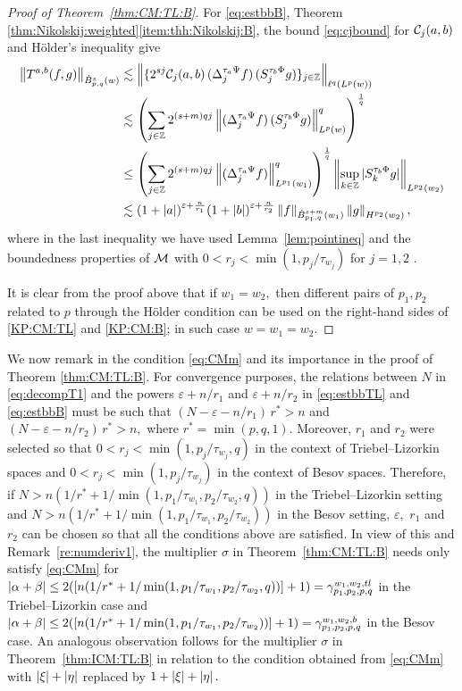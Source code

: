 \begin{proof}[Proof of Theorem~\ref{thm:CM:TL:B}]
For \eqref{eq:estbbB},  Theorem \ref{thm:Nikolskij:weighted}\eqref{item:thh:Nikolskij:B}, the bound \eqref{eq:cjbound} for $\mathcal{C}_j(a,b)$ and H\"older's inequality  give
\begin{align*}
\left\|T^{a,b}(f,g)\right\|_{\dot{B}^s_{p,q}(w)} & \lesssim \left\|\{2^{sj} \mathcal{C}_j(a,b) \,(\Delta^{ \tau_a \Psi }_{j} f ) \, (S^{ \tau_b \Phi }_{j} g)\}_{j\in\mathbb{Z}} \right\|_{\ell^q(L^p(w))}\\
& \lesssim \left(\sum\limits_{j \in \mathbb{Z}}  2^{(s +m) q j}  \left\|(\Delta^{ \tau_a \Psi }_{j} f ) \, (S^{ \tau_b \Phi }_{j} g)\right\|_{L^p(w)}^q   \right)^\frac{1}{q}  \\
&\le  \left(\sum\limits_{j \in \mathbb{Z}}  2^{(s +m) q j}  \left\|(\Delta^{ \tau_a \Psi }_{j} f ) \right\|_{L^{p_1}(w_1)}^q   \right)^\frac{1}{q}  \left\|\sup_{k\in \mathbb{Z}}|S^{ \tau_b \Phi }_{k} g|\right\|_{L^{p_2}(w_2)}\\
& \lesssim  (1+\left\vert a \right\vert)^{\varepsilon+\frac{n}{r_1}}  (1+\left\vert b \right\vert)^{\varepsilon+\frac{n}{r_2}}  \left\|f\right\|_{\dot{B}^{s+m}_{p_1, q}(w_1)} \left\|g\right\|_{H^{p_2}(w_2)},
\end{align*}
where in the last inequality we have used Lemma~\ref{lem:pointineq} and the boundedness properties of $\mathcal{M}$ with  $0<r_j<\min(1,p_j/\tau_{w_j})$ for $j=1,2$ .


It is clear from the proof above that if $w_1=w_2,$ then  different pairs of $p_1, p_2$ related to $p$ through the H\"older condition can be used on the right-hand sides of \eqref{KP:CM:TL} and \eqref{KP:CM:B}; in such case $w=w_1=w_2.$  
\end{proof}


We now remark in the condition \ref{eq:CMm} and its importance in the proof of Theorem \ref{thm:CM:TL:B}.
For convergence purposes, the relations between $N$ in \eqref{eq:decompT1} and the powers  $\varepsilon+n/r_1$ and $\varepsilon+n/r_2$ in \eqref{eq:estbbTL} and   \eqref{eq:estbbB} must be such that $(N-\varepsilon-n/r_1)\,r^*>n$ and $(N-\varepsilon-n/r_2)\,r^*>n,$ where $r^*=\min(p,q,1).$ Moreover,  $r_1$ and $r_2$ were selected so that $0<r_j<\min(1, p_j/\tau_{w_j},q)$ in the context of  Triebel--Lizorkin spaces and  $0<r_j<\min(1,p_j/\tau_{w_j})$ in the context of Besov spaces. Therefore, if  $N>n(1/r^*+1/\min(1, p_1/\tau_{w_1},p_2/\tau_{w_2},q))$ in the Triebel--Lizorkin setting and $N>n(1/r^*+1/\min(1, p_1/\tau_{w_1},p_2/\tau_{w_2}))$ in the Besov setting,  $\varepsilon,$  $r_1$ and  $r_2$ can be chosen so that all the conditions above are satisfied. In view of this and Remark~\ref{re:numderiv1},  the multiplier $\sigma$ in Theorem~\ref{thm:CM:TL:B}  needs only satisfy  \eqref{eq:CMm} for $\left\vert \alpha+\beta \right\vert\le 2( [n(1/r^*+1/\min(1,p_1/\tau_{w_1},p_2/\tau_{w_2},q))]+1)=\gamma_{p_1,p_2,p,q}^{w_1,w_2, tl}$ in the Triebel--Lizorkin case and $\left\vert \alpha+\beta \right\vert\le 2( [n(1/r^*+1/\min(1, p_1/\tau_{w_1},p_2/\tau_{w_2}))]+1)=\gamma_{p_1,p_2,p,q}^{w_1,w_2,b}$ in the Besov case. An analogous observation follows for the multiplier $\sigma$ in Theorem~\ref{thm:ICM:TL:B} in relation to the condition  obtained from \eqref{eq:CMm} with $\left\vert \xi \right\vert+\left\vert \eta \right\vert$ replaced by $1+\left\vert \xi \right\vert+\left\vert \eta \right\vert.$ 


